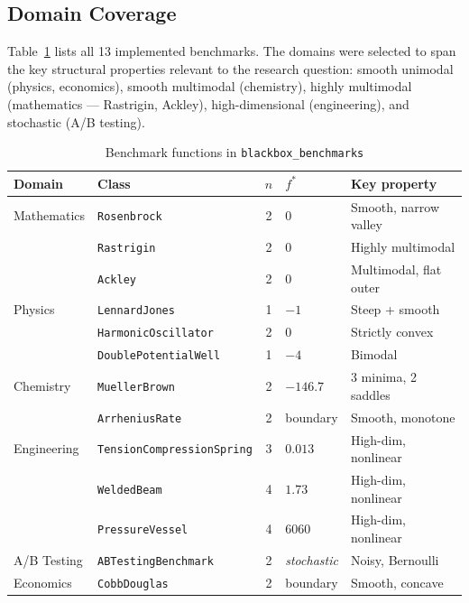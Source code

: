 \subsection{Domain Coverage}

Table~\ref{tab:benchmarks} lists all 13 implemented benchmarks. The domains
were selected to span the key structural properties relevant to the research
question: smooth unimodal (physics, economics), smooth multimodal (chemistry),
highly multimodal (mathematics — Rastrigin, Ackley), high-dimensional
(engineering), and stochastic (A/B testing).

\begin{table}[h]
\centering
\caption{Benchmark functions in \texttt{blackbox\_benchmarks}}
\label{tab:benchmarks}
\begin{tabular}{l l c l l}
\toprule
Domain & Class & $n$ & $f^*$ & Key property \\
\midrule
Mathematics & \texttt{Rosenbrock}               & 2 & 0       & Smooth, narrow valley \\
            & \texttt{Rastrigin}                & 2 & 0       & Highly multimodal \\
            & \texttt{Ackley}                   & 2 & 0       & Multimodal, flat outer \\
\midrule
Physics     & \texttt{LennardJones}             & 1 & $-1$    & Steep + smooth \\
            & \texttt{HarmonicOscillator}       & 2 & 0       & Strictly convex \\
            & \texttt{DoublePotentialWell}      & 1 & $-4$    & Bimodal \\
\midrule
Chemistry   & \texttt{MuellerBrown}             & 2 & $-146.7$& 3 minima, 2 saddles \\
            & \texttt{ArrheniusRate}            & 2 & boundary& Smooth, monotone \\
\midrule
Engineering & \texttt{TensionCompressionSpring} & 3 & $0.013$ & High-dim, nonlinear \\
            & \texttt{WeldedBeam}               & 4 & $1.73$  & High-dim, nonlinear \\
            & \texttt{PressureVessel}           & 4 & $6060$  & High-dim, nonlinear \\
\midrule
A/B Testing & \texttt{ABTestingBenchmark}       & 2 & \emph{stochastic} & Noisy, Bernoulli \\
\midrule
Economics   & \texttt{CobbDouglas}              & 2 & boundary& Smooth, concave \\
\bottomrule
\end{tabular}
\end{table}

